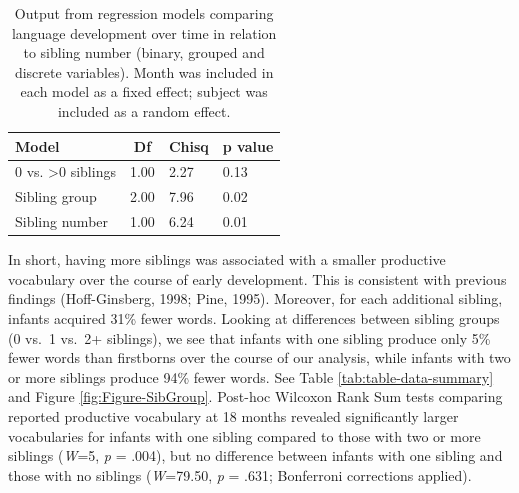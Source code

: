 \documentclass[
  english,
  man,floatsintext]{apa6}
\begin{document}
\begin{table}[H]

\begin{center}
\begin{threeparttable}

\caption{\label{tab:table-sibling-model-output}Output from regression models comparing language development over time in relation to sibling number (binary, grouped and discrete variables). Month was included in each model as a fixed effect; subject was included as a random effect.}

\small{

\begin{tabular}{llll}
\toprule
Model & \multicolumn{1}{c}{Df} & \multicolumn{1}{c}{Chisq} & \multicolumn{1}{c}{p value}\\
\midrule
0 vs. >0 siblings & 1.00 & 2.27 & 0.13\\
Sibling group & 2.00 & 7.96 & 0.02\\
Sibling number & 1.00 & 6.24 & 0.01\\
\bottomrule
\end{tabular}

}

\end{threeparttable}
\end{center}

\end{table}

In short, having more siblings was associated with a smaller productive vocabulary over the course of early development. This is consistent with previous findings (Hoff-Ginsberg, 1998; Pine, 1995). Moreover, for each additional sibling, infants acquired 31\% fewer words. Looking at differences between sibling groups (0 vs.~1 vs.~2+ siblings), we see that infants with one sibling produce only 5\% fewer words than firstborns over the course of our analysis, while infants with two or more siblings produce 94\% fewer words. See Table \ref{tab:table-data-summary} and Figure \ref{fig:Figure-SibGroup}. Post-hoc Wilcoxon Rank Sum tests comparing reported productive vocabulary at 18 months revealed significantly larger vocabularies for infants with one sibling compared to those with two or more siblings (\emph{W}=5, \emph{p} = .004), but no difference between infants with one sibling and those with no siblings (\emph{W}=79.50, \emph{p} = .631; Bonferroni corrections applied).
\end{document}

